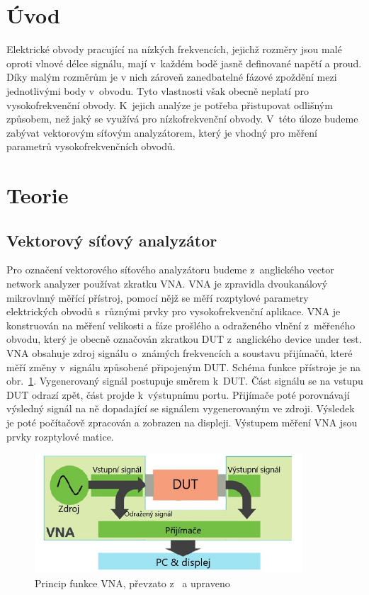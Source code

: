 \documentclass{protokol}
\begin{document}
\headernoenv

\section{Úvod}
Elektrické obvody pracující na nízkých frekvencích,
jejichž rozměry jsou malé oproti vlnové délce signálu,
mají v~každém bodě jasně definované napětí a proud.
Díky malým rozměrům je v nich zároveň zanedbatelné fázové zpoždění
mezi jednotlivými body v~obvodu.
Tyto vlastnosti však obecně neplatí pro vysokofrekvenční obvody.
K~jejich analýze je potřeba přistupovat odlišným způsobem,
než jaký se využívá pro nízkofrekvenční obvody.\cite{Pozar}
V~této úloze budeme zabývat vektorovým síťovým analyzátorem,
který je vhodný pro měření parametrů vysokofrekvenčních obvodů.

\section{Teorie}

\subsection{Vektorový síťový analyzátor}

Pro označení vektorového síťového analyzátoru budeme z~anglického
vector network analyzer používat zkratku VNA.
VNA je zpravidla dvoukanálový mikrovlnný měřící přístroj,
pomocí nějž se měří rozptylové parametry elektrických obvodů
s~různými prvky pro vysokofrekvenční aplikace.
VNA je konstruován na měření velikosti a fáze prošlého a odraženého vlnění
z~měřeného obvodu,
který je obecně označován zkratkou DUT z~anglického device under test.%
\cite{Pozar}
VNA obsahuje zdroj signálu o~známých frekvencích a soustavu přijímačů,
které měří změny v~signálu způsobené připojeným DUT.
Schéma funkce přístroje je na obr.~\ref{VNA}.
Vygenerovaný signál postupuje směrem k~DUT.
Část signálu se na vstupu DUT odrazí zpět, část projde k~výstupnímu portu.
Přijímače poté porovnávají výsledný signál na ně dopadající
se signálem vygenerovaným ve zdroji.
Výsledek je poté počítačově zpracován a zobrazen na displeji.
Výstupem měření VNA jsou prvky rozptylové matice.

\begin{figure}[b]
	\centering
	\includegraphics[width=100mm,]{network-analyzer-diagram}
	\caption{Princip funkce VNA, převzato z~\cite{schema} a upraveno}
	\label{VNA}
\end{figure}
\end{document}
